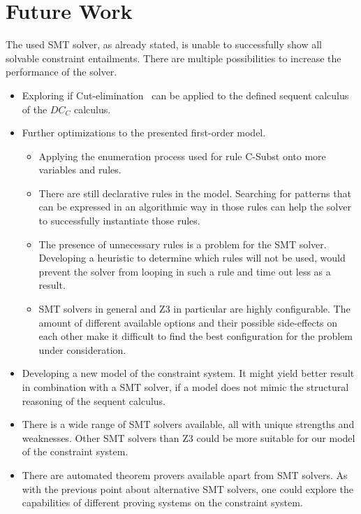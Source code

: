 \section{Future Work}
The used SMT solver, as already stated, is unable to successfully
show all solvable constraint entailments.
There are multiple possibilities to increase the performance of the solver.
\begin{itemize}
  \item Exploring if Cut-elimination~\cite{cutelim} can be applied to the defined sequent calculus
        of the $DC_C$ calculus.
  \item Further optimizations to the presented first-order model.
  \begin{itemize}
    \item Applying the enumeration process used for rule C-Subst
          onto more variables and rules.
    \item There are still declarative rules in the model.
          Searching for patterns that can be expressed in an algorithmic
          way in those rules can help the solver to successfully instantiate those rules.
    \item The presence of unnecessary rules is a problem for the SMT solver.
          Developing a heuristic to determine which rules will not be used,
          would prevent the solver from looping in such a rule and time out less as a result.
    \item SMT solvers in general and Z3 in particular are highly configurable.
          The amount of different available options and their possible side-effects on each other
          make it difficult to find the best configuration for the problem under consideration.
  \end{itemize}
  \item Developing a new model of the constraint system.
        It might yield better result in combination with a SMT solver,
        if a model does not mimic the structural reasoning of the sequent calculus.
  \item There is a wide range of SMT solvers available,
        all with unique strengths and weaknesses.
        Other SMT solvers than Z3 could be more suitable for our model of the constraint system.
  \item There are automated theorem provers available apart from SMT solvers.
        As with the previous point about alternative SMT solvers,
        one could explore the capabilities of different proving systems
        on the constraint system.
\end{itemize}

